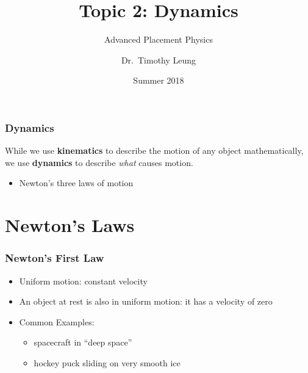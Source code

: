 \documentclass[12pt,compress,aspectratio=169]{beamer}
\title{Topic 2: Dynamics}
\subtitle{Advanced Placement Physics}
\author[TML]{Dr.\ Timothy Leung}
\institute{Olympiads School}
\date{Summer 2018}
\begin{document}
\begin{frame}
  \maketitle
\end{frame}

\begin{frame}
  \frametitle{Dynamics}
  While we use \textbf{kinematics} to describe the motion of any object
  mathematically, we use \textbf{dynamics} to describe \emph{what} causes
  motion.
  \begin{itemize}
  \item Newton's three laws of motion
  \end{itemize}
\end{frame}



\section{Newton's Laws}

\begin{frame}
  \frametitle{Newton's First Law}
  \begin{center}
  \end{center}

  \vspace{.3in}
  \begin{itemize}
  \item Uniform motion: constant velocity
  \item An object at rest is also in uniform motion: it has a velocity of zero
  \item Common Examples:
    \begin{itemize}
    \item spacecraft in ``deep space''
    \item hockey puck sliding on very smooth ice
    \end{itemize}
  \end{itemize}
\end{frame}
\end{document}
